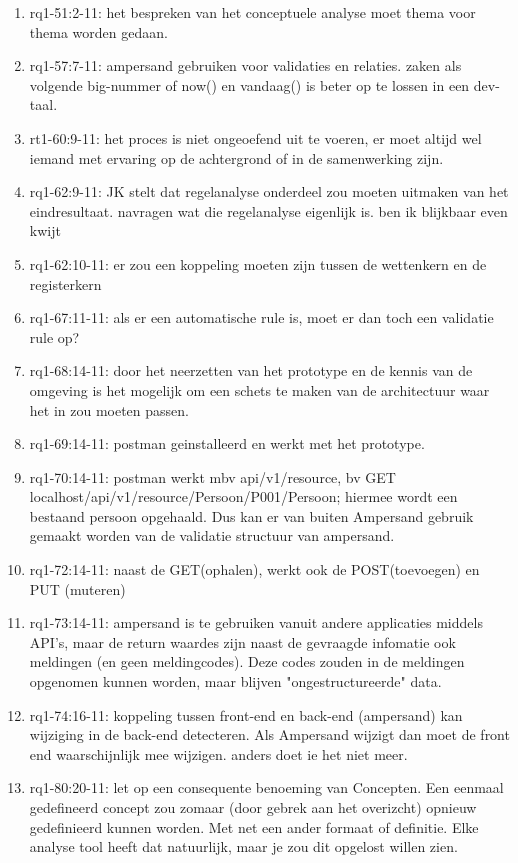 \begin{enumerate}
    \item rq1-51:2-11: het bespreken van het conceptuele analyse moet thema voor thema worden gedaan.
    \item rq1-57:7-11: ampersand gebruiken voor validaties en relaties. zaken als volgende big-nummer of now() en vandaag() is beter op te lossen in een dev-taal.
    \item rt1-60:9-11: het proces is niet ongeoefend uit te voeren, er moet altijd wel iemand met ervaring op de achtergrond of in de samenwerking zijn.
    \item rq1-62:9-11: JK stelt dat regelanalyse onderdeel zou moeten uitmaken van het eindresultaat. navragen wat die regelanalyse eigenlijk is. ben ik blijkbaar even kwijt
    \item rq1-62:10-11: er zou een koppeling moeten zijn tussen de wettenkern en de registerkern
    \item rq1-67:11-11: als er een automatische rule is, moet er dan toch een validatie rule op?
    \item rq1-68:14-11: door het neerzetten van het prototype en de kennis van de omgeving is het mogelijk om een schets te maken van de architectuur waar het in zou moeten passen.
    \item rq1-69:14-11: postman geinstalleerd en werkt met het prototype.
    \item rq1-70:14-11: postman werkt mbv api/v1/resource, bv GET localhost/api/v1/resource/Persoon/P001/Persoon; 
    hiermee wordt een bestaand persoon opgehaald. 
    Dus kan er van buiten Ampersand gebruik gemaakt worden van de validatie structuur van ampersand.
    \item rq1-72:14-11: naast de GET(ophalen), werkt ook de POST(toevoegen) en PUT (muteren)
    \item rq1-73:14-11: ampersand is te gebruiken vanuit andere applicaties middels API's, maar de return waardes zijn naast de gevraagde infomatie ook meldingen (en geen meldingcodes). Deze codes zouden in de meldingen opgenomen kunnen worden, maar blijven "ongestructureerde" data.
    \item rq1-74:16-11: koppeling tussen front-end en back-end (ampersand) kan wijziging in de back-end detecteren. Als Ampersand wijzigt dan moet de front end waarschijnlijk mee wijzigen. anders doet ie het niet meer.
    \item rq1-80:20-11: let op een consequente benoeming van Concepten. Een eenmaal gedefineerd concept zou zomaar (door gebrek aan het overizcht) opnieuw gedefinieerd kunnen worden. Met net een ander formaat of definitie. Elke analyse tool heeft dat natuurlijk, maar je zou dit opgelost willen zien.

\end{enumerate}
